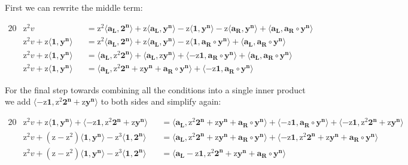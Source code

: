 \documentclass{article}
\newcommand{\eq}[1]{\begin{alignat*}{20}#1\end{alignat*}}
\renewcommand{\vec}[1]{\boldsymbol{#1}}
\newcommand{\ran}[1]{\mathrm{#1}}
\newcommand{\vecran}[1]{\mathbf{#1}}
\newcommand{\dotp}[2]{\langle #1, #2 \rangle}
\newcommand{\opn}[1]{\operatorname{#1}}
\newcommand{\vecl}[1]{\vec{#1_{\opn{L}}}}
\newcommand{\vecr}[1]{\vec{#1_{\opn{R}}}}
\begin{document}
First we can rewrite the middle term:

\eq{	
	&\ran{z^2}v &&= 
	\ran{z^2}\dotp{\vecl{a}}{\vec{2^n}} +
	\ran{z}\dotp{\vecl{a}}{\vecran{y}^{\vec{n}}} -
	\ran{z}\dotp{\vec{1}}{\vecran{y}^{\vec{n}}} -
	\ran{z}\dotp{\vecr{a}}{\vecran{y}^{\vec{n}}} +
	\dotp{\vecl{a}}{\vecr{a}\circ \vecran{y}^{\vec{n}}} \\
	&\ran{z^2}v + \ran{z}\dotp{\vec{1}}{\vecran{y}^{\vec{n}}} 
	&&= \ran{z^2}\dotp{\vecl{a}}{\vec{2^n}} +
	\ran{z}\dotp{\vecl{a}}{\vecran{y}^{\vec{n}}} -
	\ran{z}\dotp{\vec{1}}{\vecr{a}\circ\vecran{y}^{\vec{n}}} +
	\dotp{\vecl{a}}{\vecr{a}\circ \vecran{y}^{\vec{n}}} \\
	&\ran{z^2}v + \ran{z}\dotp{\vec{1}}{\vecran{y}^{\vec{n}}} 
	&&= \dotp{\vecl{a}}{\ran{z^2}\vec{2^n}} +
	\dotp{\vecl{a}}{\ran{z}\vecran{y}^{\vec{n}}} +
	\dotp{-\ran{z}\vec{1}}{\vecr{a}\circ\vecran{y}^{\vec{n}}} +
	\dotp{\vecl{a}}{\vecr{a}\circ \vecran{y}^{\vec{n}}} \\
	&\ran{z^2}v + \ran{z}\dotp{\vec{1}}{\vecran{y}^{\vec{n}}} 
	&&= \dotp{\vecl{a}}{\ran{z^2}\vec{2^n} + \ran{z}\vecran{y}^{\vec{n}} + \vecr{a}\circ \vecran{y}^{\vec{n}}} +
	\dotp{-\ran{z}\vec{1}}{\vecr{a}\circ\vecran{y}^{\vec{n}}}
}

For the final step towards combining all the conditions into a single
inner product we add $\dotp{-\ran{z}\vec{1}}{\ran{z^2}\vec{2^n} +
\ran{z}\vecran{y}^{\vec{n}}}$ to both sides and simplify again:

\eq{
	&\ran{z^2}v + \ran{z}\dotp{\vec{1}}{\vecran{y}^{\vec{n}}} + \dotp{-\ran{z}\vec{1}}{\ran{z^2}\vec{2^n} + \ran{z}\vecran{y}^{\vec{n}}}
	&&= \dotp{\vecl{a}}{\ran{z^2}\vec{2^n} + \ran{z}\vecran{y}^{\vec{n}} + \vecr{a}\circ \vecran{y}^{\vec{n}}} +
	\dotp{-z\vec{1}}{\vecr{a}\circ\vecran{y}^{\vec{n}}} + \dotp{-\ran{z}\vec{1}}{\ran{z^2}\vec{2^n} + \ran{z}\vecran{y}^{\vec{n}}} \\ 
	&\ran{z^2}v + (\ran{z} - \ran{z^2})\dotp{\vec{1}}{\vecran{y}^{\vec{n}}} - \ran{z^3}\dotp{\vec{1}}{\vec{2^n}} &&= \dotp{\vecl{a}}{\ran{z^2}\vec{2^n} + \ran{z}\vecran{y}^{\vec{n}} + \vecr{a}\circ \vecran{y}^{\vec{n}}} + \dotp{-\ran{z}\vec{1}}{\ran{z^2}\vec{2^n}+\ran{z}\vecran{y}^{\vec{n}} + \vecr{a}\circ\vecran{y}^{\vec{n}}}
	\\
	&\ran{z^2}v + (\ran{z} - \ran{z^2})\dotp{\vec{1}}{\vecran{y}^{\vec{n}}} - \ran{z^3}\dotp{\vec{1}}{\vec{2^n}} &&= \dotp{\vecl{a}- \ran{z}\vec{1}}{\ran{z^2}\vec{2^n} + \ran{z}\vecran{y}^{\vec{n}} + \vecr{a}\circ \vecran{y}^{\vec{n}}} \\
}
\end{document}
